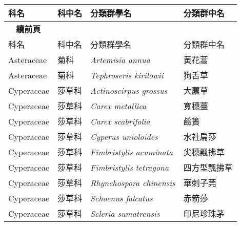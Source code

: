     \begin{longtable}{p{3cm}p{2cm}p{5cm}p{3cm}}
    \toprule
      科名 & 科中名 & 分類群學名 & 分類群中名  \\
    \midrule
    \endfirsthead
    {{\bfseries \tablename\ \thetable{} 續前頁 }} \\
    科名 & 科中名 & 分類群學名 & 分類群中名  \\
    \midrule
    \endhead
    Asteraceae & 菊科 & \textit{Artemisia annua}  \index{Artemisia@\textit{Artemisia}!annua@\textit{annua}}               & 黃花蒿 \index{黃花蒿} \\
    Asteraceae & 菊科 & \textit{Tephroseris kirilowii}  \index{Tephroseris@\textit{Tephroseris}!kirilowii@\textit{kirilowii}}         & 狗舌草 \index{狗舌草} \\
    Cyperaceae & 莎草科 & \textit{Actinoscirpus grossus}  \index{Actinoscirpus@\textit{Actinoscirpus}!grossus@\textit{grossus}}       & 大藨草 \index{大藨草} \\
    Cyperaceae & 莎草科 & \textit{Carex metallica}  \index{Carex@\textit{Carex}!metallica@\textit{metallica}}             & 寬穗薹 \index{寬穗薹} \\
    Cyperaceae & 莎草科 & \textit{Carex scabrifolia}  \index{Carex@\textit{Carex}!scabrifolia@\textit{scabrifolia}}           & 鹼簣 \index{鹼簣} \\
    Cyperaceae & 莎草科 & \textit{Cyperus unioloides}  \index{Cyperus@\textit{Cyperus}!unioloides@\textit{unioloides}}          & 水社扁莎 \index{水社扁莎} \\
    Cyperaceae & 莎草科 & \textit{Fimbristylis acuminata}  \index{Fimbristylis@\textit{Fimbristylis}!acuminata@\textit{acuminata}}      & 尖穗飄拂草 \index{尖穗飄拂草} \\
    Cyperaceae & 莎草科 & \textit{Fimbristylis tetragona}  \index{Fimbristylis@\textit{Fimbristylis}!tetragona@\textit{tetragona}}      & 四方型飄拂草 \index{四方型飄拂草} \\
    Cyperaceae & 莎草科 & \textit{Rhynchospora chinensis}  \index{Rhynchospora@\textit{Rhynchospora}!chinensis@\textit{chinensis}}      & 華刺子莞 \index{華刺子莞} \\
    Cyperaceae & 莎草科 & \textit{Schoenus falcatus}  \index{Schoenus@\textit{Schoenus}!falcatus@\textit{falcatus}}           & 赤箭莎 \index{赤箭莎} \\
    Cyperaceae & 莎草科 & \textit{Scleria sumatrensis}  \index{Scleria@\textit{Scleria}!sumatrensis@\textit{sumatrensis}}         & 印尼珍珠茅 \index{印尼珍珠茅} \\

\end{longtable}
